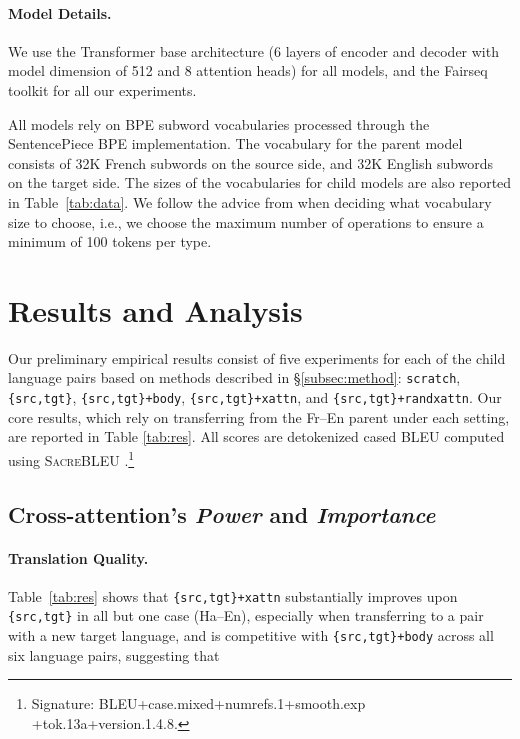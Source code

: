 \paragraph{Model Details.}

We use the Transformer base architecture (6 layers of encoder and decoder with model dimension of 512 and 8 attention heads) for all models,  \cite{NIPS2017_3f5ee243} and the Fairseq \cite{ott2019fairseq} toolkit for all our experiments.

All models rely on BPE subword vocabularies \cite{sennrich2015neural} processed through the SentencePiece \cite{kudo-richardson-2018-sentencepiece} BPE implementation. The vocabulary for the parent model consists of 32K French subwords on the source side, and 32K English subwords on the target side. The sizes of the vocabularies for child models are also reported in Table~\ref{tab:data}. We follow the advice from  when deciding what vocabulary size to choose, i.e., we choose the maximum number of operations to ensure a minimum of 100 tokens per type.

\section{Results and Analysis}
\label{sec:exp}

Our preliminary empirical results consist of five experiments for each of the child language pairs based on methods described in \S\ref{subsec:method}: \texttt{scratch}, \texttt{\{src,tgt\}}, \texttt{\{src,tgt\}+body}, \texttt{\{src,tgt\}+xattn}, and \texttt{\{src,tgt\}+randxattn}. Our core results, which rely on transferring from the Fr--En parent under each setting, are reported in Table \ref{tab:res}. All scores are detokenized cased BLEU computed using \textsc{Sacre}BLEU \cite{post-2018-call}.\footnote{Signature: BLEU+case.mixed+numrefs.1+smooth.exp \\ +tok.13a+version.1.4.8.}

\subsection{Cross-attention's \textit{Power} and \textit{Importance}}
\label{sec:powerimp}

\paragraph{Translation Quality.} Table~\ref{tab:res} shows that \texttt{\{src,tgt\}+xattn} substantially improves upon \texttt{\{src,tgt\}} in all but one case (Ha--En), especially when transferring to a pair with a new target language, and is competitive with \texttt{\{src,tgt\}+body} across all six language pairs, suggesting that

